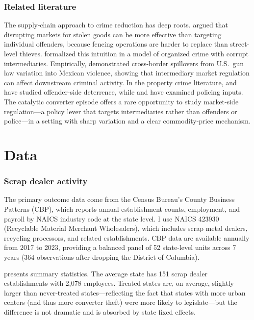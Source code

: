\documentclass[12pt]{article}
\begin{document}
\subsubsection*{Related literature} The supply-chain approach to crime reduction has deep roots. \citet{reuter1983} argued that disrupting markets for stolen goods can be more effective than targeting individual offenders, because fencing operations are harder to replace than street-level thieves. \citet{kugler2005} formalized this intuition in a model of organized crime with corrupt intermediaries. Empirically, \citet{dube2013} demonstrated cross-border spillovers from U.S.\ gun law variation into Mexican violence, showing that intermediary market regulation can affect downstream criminal activity. In the property crime literature, \citet{drago2009} and \citet{mastrobuoni2015} have studied offender-side deterrence, while \citet{di2004} and \citet{klick2005} have examined policing inputs. The catalytic converter episode offers a rare opportunity to study market-side regulation---a policy lever that targets intermediaries rather than offenders or police---in a setting with sharp variation and a clear commodity-price mechanism.


\section{Data}\label{sec:data}

\subsubsection*{Scrap dealer activity} The primary outcome data come from the Census Bureau's County Business Patterns (CBP), which reports annual establishment counts, employment, and payroll by NAICS industry code at the state level. I use NAICS 423930 (Recyclable Material Merchant Wholesalers), which includes scrap metal dealers, recycling processors, and related establishments. CBP data are available annually from 2017 to 2023, providing a balanced panel of 52 state-level units across 7 years (364 observations after dropping the District of Columbia).

 presents summary statistics. The average state has 151 scrap dealer establishments with 2,078 employees. Treated states are, on average, slightly larger than never-treated states---reflecting the fact that states with more urban centers (and thus more converter theft) were more likely to legislate---but the difference is not dramatic and is absorbed by state fixed effects.
\end{document}
